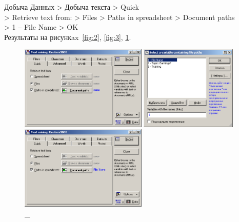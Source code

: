 \newpage

Добыча Данных > Добыча текста > Quick \\
> Retrieve text from: > Files > Paths in spreadsheet > Document paths \\
> 1 – File Name > OK \\

Результаты на рисункax~\ref{fig:2}, \ref{fig:3}, \ref{fig:4}.

\begin{figure}[!h]
  \centering

  \begin{minipage}{0.32\textwidth}
    \centering

    \includegraphics[height=4cm]
    {inc/2.PNG}

    \caption{\_}

    \label{fig:2}
  \end{minipage}
  \begin{minipage}{0.32\textwidth}
    \centering

    \includegraphics[height=4cm]
    {inc/3.PNG}

    \caption{\_}

    \label{fig:3}
  \end{minipage}
  \begin{minipage}{0.32\textwidth}
    \centering

    \includegraphics[height=4cm]
    {inc/4.PNG}

    \caption{\_}

    \label{fig:4}
  \end{minipage}
\end{figure}

